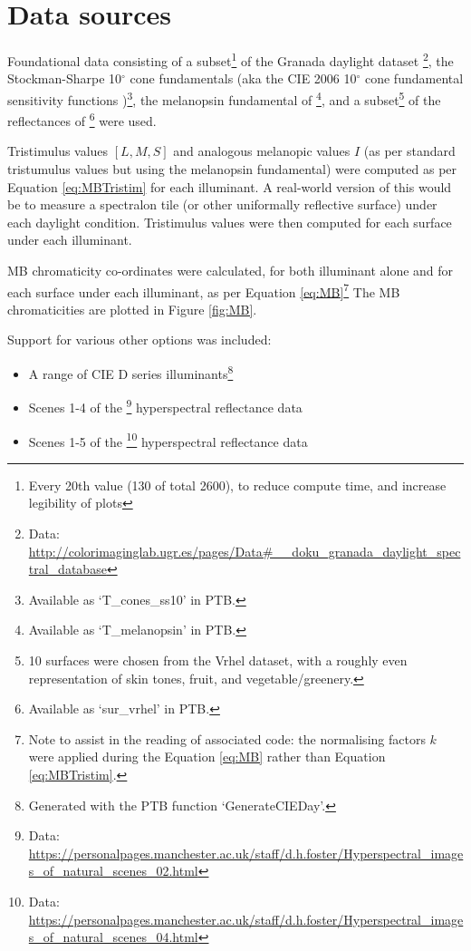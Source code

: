 \section{Data sources}

Foundational data consisting of 
a subset\footnote{Every 20th value (130 of total 2600), to reduce compute time, and increase legibility of plots} of the Granada daylight dataset 
\citep{hernandez-andres_color_2001}\footnote{Data: \url{http://colorimaginglab.ugr.es/pages/Data\#__doku_granada_daylight_spectral_database}},
the Stockman-Sharpe 10$^{\circ}$ cone fundamentals 
\citep{stockman_spectral_2000,stockman_spectral_1999}
(aka the CIE 2006 10$^{\circ}$ cone fundamental sensitivity functions \cite{cie_cie_2006})\footnote{Available as `T\_cones\_ss10' in \gls{PTB}.},
the melanopsin fundamental of \citet{lucas_measuring_2014}\footnote{Available as `T\_melanopsin' in \gls{PTB}.},
and a subset\footnote{10 surfaces were chosen from the Vrhel dataset, with a roughly even representation of skin tones, fruit, and vegetable/greenery.} 
of the reflectances of \citet{vrhel_measurement_1994}\footnote{Available as `sur\_vrhel' in \gls{PTB}.}
were used.

Tristimulus values $[L,M,S]$ and analogous melanopic values $I$ (as per standard tristumulus values but using the melanopsin fundamental) were computed as per Equation \ref{eq:MBTristim} for each illuminant. A real-world version of this would be to measure a spectralon tile (or other uniformally reflective surface) under each daylight condition. Tristimulus values were then computed for each surface under each illuminant.

\gls{MB} chromaticity co-ordinates were calculated, for both illuminant alone and for each surface under each illuminant, as per Equation \ref{eq:MB}\footnote{Note to assist in the reading of associated code: the normalising factors $k$ were applied during the Equation \ref{eq:MB} rather than Equation \ref{eq:MBTristim}.} The \gls{MB} chromaticities are plotted in Figure \ref{fig:MB}. 

\bigskip
\noindent
Support for various other options was included:
\begin{itemize}
    \item A range of CIE D series illuminants\footnote{Generated with the \gls{PTB} function `GenerateCIEDay'.}
    \item Scenes 1-4 of the
\citet{nascimento_statistics_2002}\footnote{Data: \url{https://personalpages.manchester.ac.uk/staff/d.h.foster/Hyperspectral_images_of_natural_scenes_02.html}} hyperspectral reflectance data
    \item Scenes 1-5 of the 
\citet{foster_frequency_2006}\footnote{Data: \url{https://personalpages.manchester.ac.uk/staff/d.h.foster/Hyperspectral_images_of_natural_scenes_04.html}}
hyperspectral reflectance data
\end{itemize}

